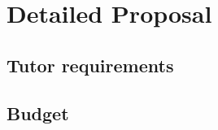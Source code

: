 \section{Detailed Proposal}\label{sec:proposal}

\subsection{Tutor requirements}\label{ssec:tutor}

\subsection{Budget}\label{ssec:budget}
